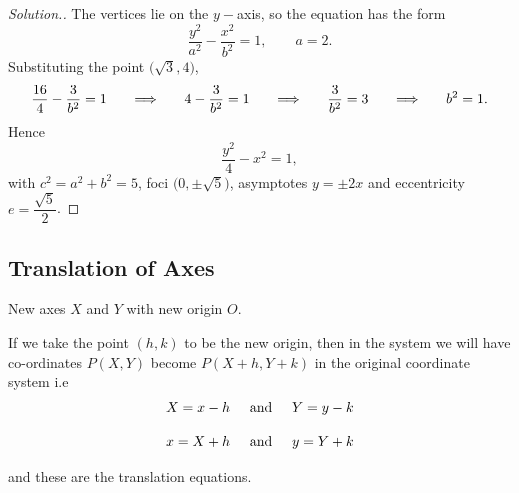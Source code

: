 \documentclass[11pt,a4paper]{article}
\theoremstyle{definition}
\newenvironment{solution}
  {\renewcommand{\qedsymbol}{}\begin{proof}[\textit{Solution}.]}
  {\end{proof}}
\begin{document}
\begin{solution}
The vertices lie on the $y-$axis, so the equation has the form
$$\dfrac{y^2}{a^2} - \dfrac{x^2}{b^2} = 1 , \qquad a = 2 .$$
Substituting the point $\big(\sqrt{3}, 4\big)$,
$$\dfrac{16}{4} - \dfrac{3}{b^2} = 1
\hspace{0.5cm}\implies\hspace{0.5cm} 4 - \dfrac{3}{b^2} = 1
\hspace{0.5cm}\implies\hspace{0.5cm} \dfrac{3}{b^2} = 3
\hspace{0.5cm}\implies\hspace{0.5cm} b^2 = 1 .$$
Hence
$$\dfrac{y^2}{4} - x^2 = 1 ,$$
with $c^2 = a^2 + b^2 = 5$, foci $\big(0, \pm\sqrt{5}\big)$, asymptotes
$y = \pm 2x$ and eccentricity $e = \dfrac{\sqrt{5}}{2}$.
\end{solution}




\subsection{Translation of Axes}

New axes $X$ and $Y$ with new origin $O$.


\begin{figure}[H]
\centering
{}
\end{figure}

If we take the point $(h,k)$ to be the new origin, then in the system we will have co-ordinates $P(X,Y)$ become $P(X + h, Y+k)$ in the original coordinate system i.e $$X = x - h\hspace{0.5cm}  \text{and} \hspace{0.5cm} Y = y -k$$

$$x = X + h\hspace{0.5cm}  \text{and} \hspace{0.5cm} y = Y + k$$

and these are the translation equations.
\end{document}

